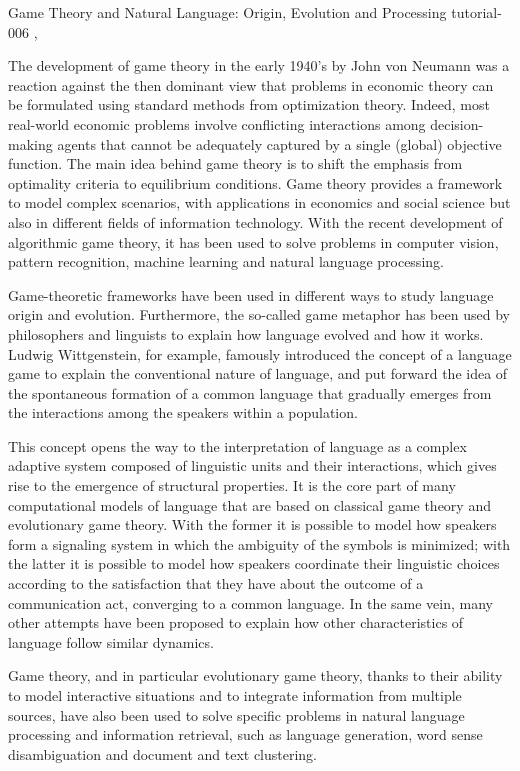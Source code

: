 \begin{tutorial}
  {Game Theory and Natural Language: Origin, Evolution and Processing}
  {tutorial-006}
  {\daydateyear, \tutorialafternoontime}
  {\TutLocF}

The development of game theory in the early 1940's by John von Neumann was a reaction against the then dominant view that problems in economic theory can be formulated using standard methods from optimization theory. Indeed, most real-world economic problems involve conflicting interactions among decision-making agents that cannot be adequately captured by a single (global) objective function. The main idea behind game theory is to shift the emphasis from optimality criteria to equilibrium conditions. Game theory provides a framework to model complex scenarios, with applications in economics and social science but also in different fields of information technology. With the recent development of algorithmic game theory, it has been used to solve problems in computer vision, pattern recognition, machine learning and natural language processing.

Game-theoretic frameworks have been used in different ways to study language origin and evolution. Furthermore, the so-called game metaphor has been used by philosophers and linguists to explain how language evolved and how it works. Ludwig Wittgenstein, for example, famously introduced the concept of a language game to explain the conventional nature of language, and put forward the idea of the spontaneous formation of a common language that gradually emerges from the interactions among the speakers within a population.

This concept opens the way to the interpretation of language as a complex adaptive system composed of linguistic units and their interactions, which gives rise to the emergence of structural properties. It is the core part of many computational models of language that are based on classical game theory and evolutionary game theory. With the former it is possible to model how speakers form a signaling system in which the ambiguity of the symbols is minimized; with the latter it is possible to model how speakers coordinate their linguistic choices according to the satisfaction that they have about the outcome of a communication act, converging to a common language. In the same vein, many other attempts have been proposed to explain how other characteristics of language follow similar dynamics.

Game theory, and in particular evolutionary game theory, thanks to their ability to model interactive situations and to integrate information from multiple sources, have also been used to solve specific problems in natural language processing and information retrieval, such as language generation, word sense disambiguation and document and text clustering.


\end{tutorial}
